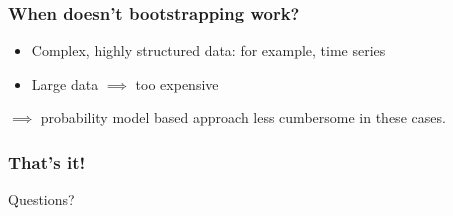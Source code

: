\documentclass[handout]{beamer}
\begin{document}
\begin{frame}
	\frametitle{When doesn't bootstrapping work?}
	
	\begin{itemize}
		\item Complex, highly structured data: for example, time series
		\item Large data $\implies$ too expensive
	\end{itemize}
	
	$\implies$ probability model based approach less cumbersome in these cases.
	
\end{frame}


\begin{frame}
	\frametitle{That's it!}
	
	\Large Questions?
\end{frame}
\end{document}
